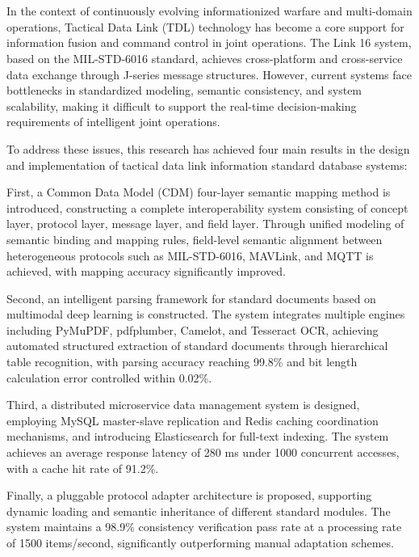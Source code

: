\newpage
\vspace{-1cm}
\chapter*{}
\vspace{-0.5cm}

In the context of continuously evolving informationized warfare and multi-domain operations, Tactical Data Link (TDL) technology has become a core support for information fusion and command control in joint operations. The Link 16 system, based on the MIL-STD-6016 standard, achieves cross-platform and cross-service data exchange through J-series message structures. However, current systems face bottlenecks in standardized modeling, semantic consistency, and system scalability, making it difficult to support the real-time decision-making requirements of intelligent joint operations.

To address these issues, this research has achieved four main results in the design and implementation of tactical data link information standard database systems:

First, a Common Data Model (CDM) four-layer semantic mapping method is introduced, constructing a complete interoperability system consisting of concept layer, protocol layer, message layer, and field layer. Through unified modeling of semantic binding and mapping rules, field-level semantic alignment between heterogeneous protocols such as MIL-STD-6016, MAVLink, and MQTT is achieved, with mapping accuracy significantly improved.

Second, an intelligent parsing framework for standard documents based on multimodal deep learning is constructed. The system integrates multiple engines including PyMuPDF, pdfplumber, Camelot, and Tesseract OCR, achieving automated structured extraction of standard documents through hierarchical table recognition, with parsing accuracy reaching 99.8\% and bit length calculation error controlled within 0.02\%.

Third, a distributed microservice data management system is designed, employing MySQL master-slave replication and Redis caching coordination mechanisms, and introducing Elasticsearch for full-text indexing. The system achieves an average response latency of 280 ms under 1000 concurrent accesses, with a cache hit rate of 91.2\%.

Finally, a pluggable protocol adapter architecture is proposed, supporting dynamic loading and semantic inheritance of different standard modules. The system maintains a 98.9\% consistency verification pass rate at a processing rate of 1500 items/second, significantly outperforming manual adaptation schemes.

